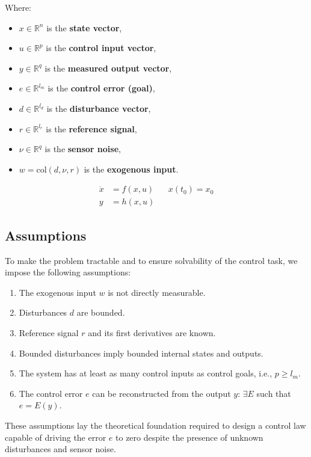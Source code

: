 \documentclass[]{report}
\begin{document}
	Where:
	\begin{itemize}
		\item $x \in \mathbb{R}^n$ is the \textbf{state vector},
		\item $u \in \mathbb{R}^p$ is the \textbf{control input vector},
		\item $y \in \mathbb{R}^q$ is the \textbf{measured output vector},
		\item $e \in \mathbb{R}^{l_m}$ is the \textbf{control error (goal)},
		\item $d \in \mathbb{R}^{l_d}$ is the \textbf{disturbance vector},
		\item $r \in \mathbb{R}^{l_r}$ is the \textbf{reference signal},
		\item $\nu \in \mathbb{R}^q$ is the \textbf{sensor noise},
		\item $w = \text{col}(d, \nu, r)$ is the \textbf{exogenous input}.
	\end{itemize}
	\begin{equation}
		\label{eq:FormulaA}
		\begin{aligned}
			\dot{x} &= f(x,u) && x(t_0) = x_0
			\\
			y &= h(x,u)
		\end{aligned}
	\end{equation}
	\subsection*{Assumptions}
	
	To make the problem tractable and to ensure solvability of the control task, we impose the following assumptions:
	
	\begin{enumerate}
		\item The exogenous input $w$ is not directly measurable.
		\item Disturbances $d$ are bounded.
		\item Reference signal $r$ and its first derivatives are known.
		\item Bounded disturbances imply bounded internal states and outputs.
		\item The system has at least as many control inputs as control goals, i.e., $p \geq l_m$.
		\item The control error $e$ can be reconstructed from the output $y$: $\exists E$ such that $e = E(y)$.
	\end{enumerate}
	
	These assumptions lay the theoretical foundation required to design a control law capable of driving the error $e$ to zero despite the presence of unknown disturbances and sensor noise.
	
\end{document}

